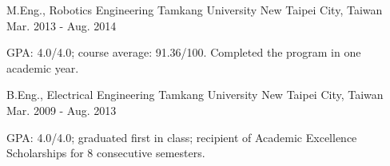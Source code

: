 

\begin{cventries}

  \cventry
    {M.Eng., Robotics Engineering} %
    {Tamkang University} %
    {New Taipei City, Taiwan} %
    {Mar. 2013 - Aug. 2014} %
    {
      \begin{cvitems} %
	\item {GPA: 4.0/4.0; course average: 91.36/100. Completed the program in one academic year.}
      \end{cvitems}
    }

  \cventry
    {B.Eng., Electrical Engineering} %
    {Tamkang University} %
    {New Taipei City, Taiwan} %
    {Mar. 2009 - Aug. 2013} %
    {
      \begin{cvitems} %
	\item {GPA: 4.0/4.0; graduated first in class; recipient of Academic Excellence Scholarships for 8 consecutive semesters.}
      \end{cvitems}
    }

\end{cventries}
